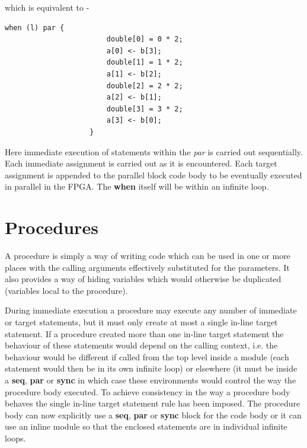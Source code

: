                 which is equivalent to -
                \begin{lstlisting}[gobble=16, language=threepl]
                    when (l) par {
                        double[0] = 0 * 2;
                        a[0] <- b[3];
                        double[1] = 1 * 2;
                        a[1] <- b[2];
                        double[2] = 2 * 2;
                        a[2] <- b[1];
                        double[3] = 3 * 2;
                        a[3] <- b[0];
                    }
                \end{lstlisting}
                Here immediate execution of statements within the {\em par} is
                carried out sequentially. Each immediate assignment is carried out
                as it is encountered. Each target assignment is appended to the
                parallel block code body to be eventually executed in parallel in
                the FPGA. The {\bf when} itself will be within an infinite loop.






    \section{Procedures}

        A procedure is simply a way of writing code which can be used in one
        or more places with the calling arguments effectively substituted for
        the parameters. It also provides a way of hiding
        variables which would otherwise be duplicated (variables local to the
        procedure).

        During immediate execution a procedure may execute any number of immediate
        or target statements, but it must only create at most a single in-line
        target statement. If a procedure created more than one in-line target
        statement the behaviour of these statements would depend on the calling
        context, i.e. the behaviour would be different if called from the top level
        inside a module (each statement would then be in its own infinite loop) or
        elsewhere (it must be inside a {\bf seq}, {\bf par} or {\bf sync} in which
        case these environments would control the way the procedure body executed.
        To achieve consistency in the way a procedure body behaves the single
        in-line target statement rule has been imposed. The procedure body can now
        explicitly use a {\bf seq}, {\bf par} or {\bf sync} block for the code body
        or it can use an inline module so that the enclosed statements are in
        individual infinite loops.

